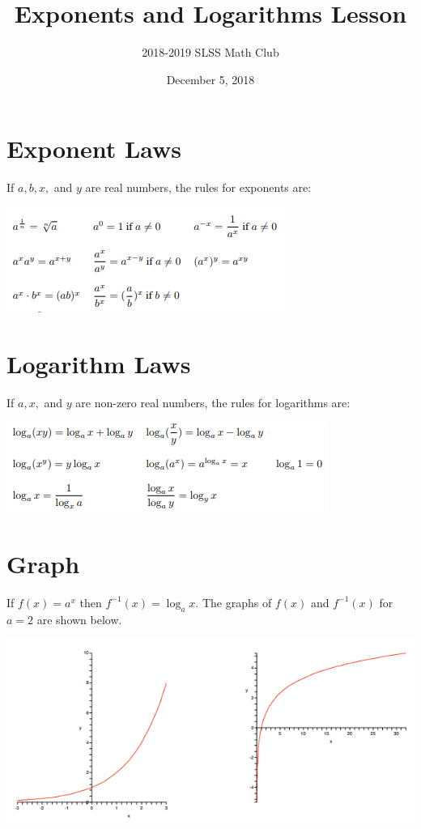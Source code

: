 \documentclass[12pt]{article}
\title{Exponents and Logarithms Lesson\vspace{-3mm}}
\author{2018-2019 SLSS Math Club\vspace{-5mm}}
\date{December 5, 2018\vspace{-5mm}}
\begin{document}
\maketitle
\section{Exponent Laws}
If $a, b, x,$ and $y$ are real numbers, the rules for exponents are:
\begin{center}
    \includegraphics[scale = 1.0]{Graphics/Week_9/Exponent.PNG}
\end{center}
\section{Logarithm Laws}
If $a, x,$ and $y$ are non-zero real numbers, the rules for logarithms are:
\begin{center}
    \includegraphics[scale = 1.0]{Graphics/Week_9/Log.PNG}
\end{center}
\section{Graph}
If $f(x) = a^x$ then $f^{-1}(x) = \log_ax$. The graphs of $f(x)$ and $f^{-1}(x)$ for $a = 2$ are shown below.
\begin{center}
    \includegraphics[scale = 1.0]{Graphics/Week_9/Graph.PNG}
\end{center}
\end{document}

